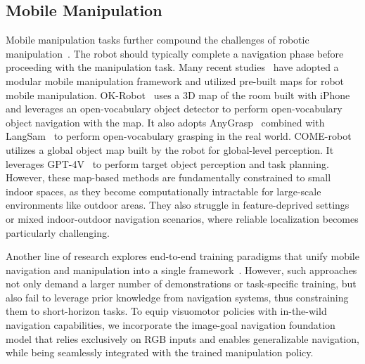 \subsection{Mobile Manipulation}
Mobile manipulation tasks further compound the challenges of robotic manipulation~\cite{yenamandra2023homerobot,fu2024mobile,huang2023skill,Liu_2024,zhi2025closedloopopenvocabularymobilemanipulation,wu2023tidybot}. The robot should typically complete a navigation phase before proceeding with the manipulation task. Many recent studies~\cite{Liu_2024,fang2023anygrasp,langsam2023,zhi2025closedloopopenvocabularymobilemanipulation} have adopted a modular mobile manipulation framework and utilized pre-built maps for robot mobile manipulation. OK-Robot~\cite{Liu_2024} uses a 3D map of the room built with iPhone and leverages an open-vocabulary object detector to perform open-vocabulary object navigation with the map. It also adopts AnyGrasp~\cite{fang2023anygrasp} combined with LangSam~\cite{langsam2023} to perform open-vocabulary grasping in the real world. COME-robot ~\cite{zhi2025closedloopopenvocabularymobilemanipulation} utilizes a global object map built by the robot for global-level perception. It leverages GPT-4V~\cite{gpt4v} to perform target object perception and task planning. However, these map-based methods are fundamentally constrained to small indoor spaces, as they become computationally intractable for large-scale environments like outdoor areas. They also struggle in feature-deprived settings or mixed indoor-outdoor navigation scenarios, where reliable localization becomes particularly challenging.

Another line of research explores end-to-end training paradigms that unify mobile navigation and manipulation into a single framework~\cite{jiang2025behavior,xiong2024adaptive,meng2025aim,yang2024harmonic}. However, such approaches not only demand a larger number of demonstrations or task-specific training, but also fail to leverage prior knowledge from navigation systems, thus constraining them to short-horizon tasks. To equip visuomotor policies with in-the-wild navigation capabilities, we incorporate the image-goal navigation foundation model that relies exclusively on RGB inputs and enables generalizable navigation, while being seamlessly integrated with the trained manipulation policy.




